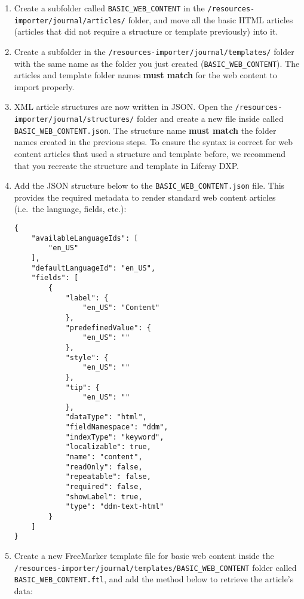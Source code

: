 \begin{enumerate}
\def\labelenumi{\arabic{enumi}.}
\item
  Create a subfolder called \texttt{BASIC\_WEB\_CONTENT} in the
  \texttt{/resources-importer/journal/articles/} folder, and move all
  the basic HTML articles (articles that did not require a structure or
  template previously) into it.
\item
  Create a subfolder in the
  \texttt{/resources-importer/journal/templates/} folder with the same
  name as the folder you just created (\texttt{BASIC\_WEB\_CONTENT}).
  The articles and template folder names \textbf{must match} for the web
  content to import properly.
\item
  XML article structures are now written in JSON. Open the
  \texttt{/resources-importer/journal/structures/} folder and create a
  new file inside called \texttt{BASIC\_WEB\_CONTENT.json}. The
  structure name \textbf{must match} the folder names created in the
  previous steps. To ensure the syntax is correct for web content
  articles that used a structure and template before, we recommend that
  you recreate the structure and template in Liferay DXP.
\item
  Add the JSON structure below to the \texttt{BASIC\_WEB\_CONTENT.json}
  file. This provides the required metadata to render standard web
  content articles (i.e.~the language, fields, etc.):

\begin{verbatim}
{
    "availableLanguageIds": [
        "en_US"
    ],
    "defaultLanguageId": "en_US",
    "fields": [
        {
            "label": {
                "en_US": "Content"
            },
            "predefinedValue": {
                "en_US": ""
            },
            "style": {
                "en_US": ""
            },
            "tip": {
                "en_US": ""
            },
            "dataType": "html",
            "fieldNamespace": "ddm",
            "indexType": "keyword",
            "localizable": true,
            "name": "content",
            "readOnly": false,
            "repeatable": false,
            "required": false,
            "showLabel": true,
            "type": "ddm-text-html"
        }
    ]
}
\end{verbatim}
\item
  Create a new FreeMarker template file for basic web content inside the
  \texttt{/resources-importer/journal/templates/BASIC\_WEB\_CONTENT}
  folder called \texttt{BASIC\_WEB\_CONTENT.ftl}, and add the method
  below to retrieve the article's data:


\end{enumerate}
